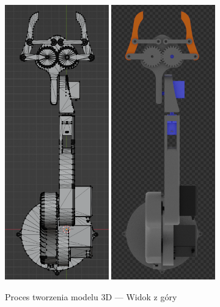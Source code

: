 \documentclass[11pt,titlepage]{article}
\begin{document}
\begin{figure}[p]
    \begin{center}
        \includegraphics[width=0.4\textwidth]{img/topW.png}
        \includegraphics[width=0.4\textwidth]{img/topC.png}
    \end{center}
    \caption{Proces tworzenia modelu 3D — Widok z góry}
    \label{Modelowanie3Dtop}
\end{figure}
\end{document}
